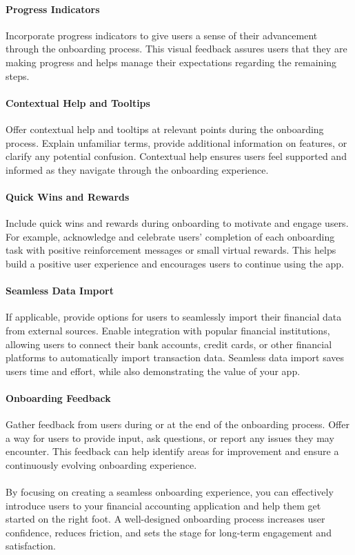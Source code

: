\paragraph{Progress Indicators}
Incorporate progress indicators to give users a sense of their advancement through the onboarding 
process. This visual feedback assures users that they are making progress and helps manage their expectations regarding 
the remaining steps.

\paragraph{Contextual Help and Tooltips}
Offer contextual help and tooltips at relevant points during the onboarding process. 
Explain unfamiliar terms, provide additional information on features, or clarify any potential confusion. Contextual 
help ensures users feel supported and informed as they navigate through the onboarding experience.

\paragraph{Quick Wins and Rewards}
Include quick wins and rewards during onboarding to motivate and engage users. For example, 
acknowledge and celebrate users' completion of each onboarding task with positive reinforcement messages or small 
virtual rewards. This helps build a positive user experience and encourages users to continue using the app.

\paragraph{Seamless Data Import}
If applicable, provide options for users to seamlessly import their financial data from external 
sources. Enable integration with popular financial institutions, allowing users to connect their bank accounts, credit 
cards, or other financial platforms to automatically import transaction data. Seamless data import saves users time 
and effort, while also demonstrating the value of your app.

\paragraph{Onboarding Feedback}
Gather feedback from users during or at the end of the onboarding process. Offer a way for users 
to provide input, ask questions, or report any issues they may encounter. This feedback can help identify areas for 
improvement and ensure a continuously evolving onboarding experience.
\\
\\
By focusing on creating a seamless onboarding experience, you can effectively introduce users to your financial 
accounting application and help them get started on the right foot. A well-designed onboarding process increases 
user confidence, reduces friction, and sets the stage for long-term engagement and satisfaction.


